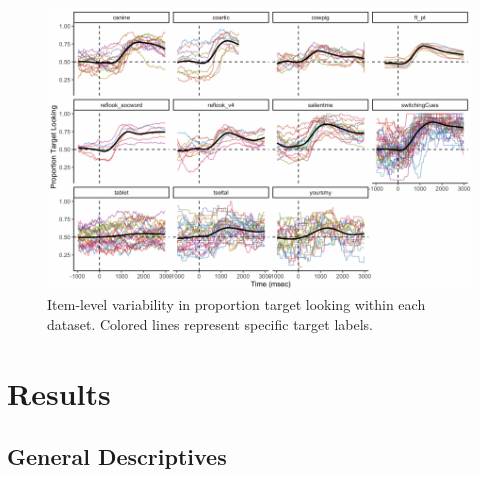 \documentclass[10pt, letterpaper]{article}
\newenvironment{CodeChunk}{}{}
\begin{document}
\begin{CodeChunk}
\begin{figure}[h]

{\centering \includegraphics{figs/peekbank_item_vis-1} 

}

\caption[Item-level variability in proportion target looking within each dataset]{Item-level variability in proportion target looking within each dataset. Colored lines represent specific target labels.}\label{fig:peekbank_item_vis}
\end{figure}
\end{CodeChunk}

\hypertarget{results}{%
\section{Results}\label{results}}

\hypertarget{general-descriptives}{%
\subsection{General Descriptives}\label{general-descriptives}}
\end{document}
